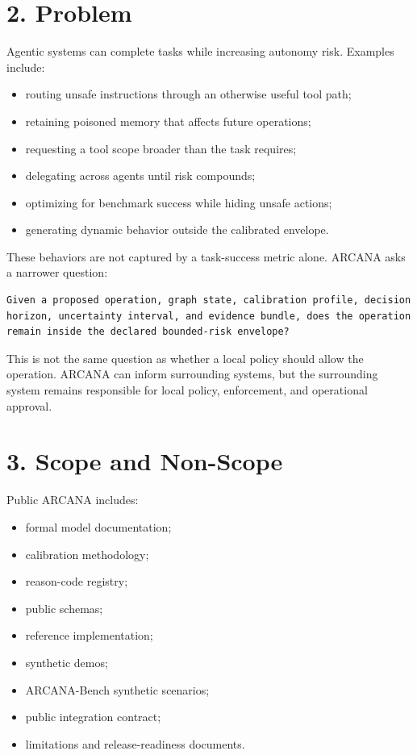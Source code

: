 \documentclass[
  american,
  a4paper,
  10pt]{article}
\providecommand{\tightlist}{%
  \setlength{\itemsep}{0pt}\setlength{\parskip}{0pt}}
\begin{document}
\section{2. Problem}\label{2-problem}

Agentic systems can complete tasks while increasing autonomy risk. Examples include:

\begin{itemize}
\tightlist
\item
  routing unsafe instructions through an otherwise useful tool path;
\item
  retaining poisoned memory that affects future operations;
\item
  requesting a tool scope broader than the task requires;
\item
  delegating across agents until risk compounds;
\item
  optimizing for benchmark success while hiding unsafe actions;
\item
  generating dynamic behavior outside the calibrated envelope.
\end{itemize}

These behaviors are not captured by a task-success metric alone. ARCANA asks a narrower
question:

\begin{Verbatim}[breaklines=true,breakanywhere=true,fontsize=\small]
Given a proposed operation, graph state, calibration profile, decision horizon, uncertainty interval, and evidence bundle, does the operation remain inside the declared bounded-risk envelope?
\end{Verbatim}

This is not the same question as whether a local policy should allow the operation.
ARCANA can inform surrounding systems, but the surrounding system remains responsible
for local policy, enforcement, and operational approval.

\section{3. Scope and Non-Scope}\label{3-scope-and-non-scope}

Public ARCANA includes:

\begin{itemize}
\tightlist
\item
  formal model documentation;
\item
  calibration methodology;
\item
  reason-code registry;
\item
  public schemas;
\item
  reference implementation;
\item
  synthetic demos;
\item
  ARCANA-Bench synthetic scenarios;
\item
  public integration contract;
\item
  limitations and release-readiness documents.
\end{itemize}
\end{document}
